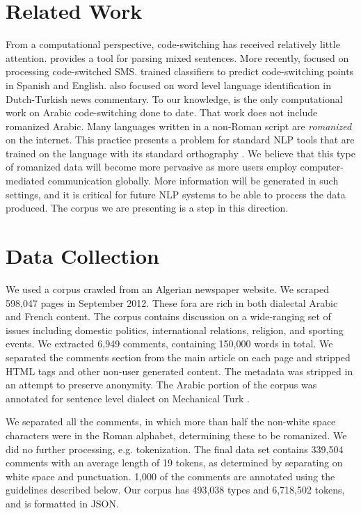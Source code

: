 \documentclass[10pt, a4paper]{article}
\begin{document}
\section{Related Work}
From a computational perspective, code-switching has received
relatively little attention.  provides
a tool for parsing mixed sentences. More recently,
 focused on processing code-switched
SMS.  trained classifiers to predict
code-switching points in Spanish and English. 
also focused on word level language identification in Dutch-Turkish
news commentary. To our knowledge,  is the
only computational work on Arabic code-switching done to date. That
work does not include romanized Arabic. Many languages written in a
non-Roman script are \emph{romanized} on the internet. This practice
presents a problem for standard NLP tools that are trained on the
language with its standard orthography \cite{irvine2012processing}. We
believe that this type of romanized data will become more pervasive as
more users employ computer-mediated communication globally. More information
will be generated in such settings, and it is critical for future NLP
systems to be able to process the data produced. The corpus we are
presenting is a step in this direction.

\section{Data Collection}
We used a corpus crawled from an Algerian newspaper
website. We scraped 598,047 pages in September 2012. These fora are
rich in both dialectal Arabic and French content. The
corpus contains discussion on a wide-ranging set of issues including
domestic politics, international relations, religion, and sporting
events.  We extracted 6,949 comments, containing 150,000 words in
total. We separated the comments section from the main article on each
page and stripped HTML tags and other non-user generated content. The
metadata was stripped in an attempt to preserve anonymity.  The Arabic
portion of the corpus was annotated for sentence level dialect on
Mechanical Turk \cite{cotterell2014extended}.

We separated all the comments, in which more than half the non-white
space characters were in the Roman alphabet, determining these to be
romanized.  We did no further processing, e.g. tokenization.  The
final data set contains 339,504 comments with an average
length of 19 tokens, as determined by separating on white space and
punctuation. 1,000 of the comments are annotated using
the guidelines described below. Our corpus has 493,038 types and 6,718,502 tokens, and is
formatted in JSON.
\end{document}
